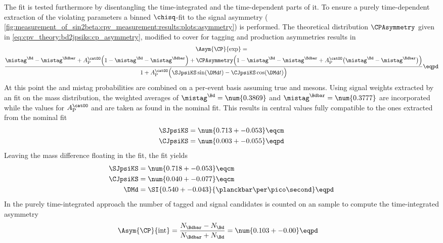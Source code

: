 The fit is tested furthermore by disentangling the time-integrated and the
time-dependent parts of it. To ensure a purely time-dependent extraction of the
\CP violating parameters a binned $\chisq$-fit to the signal \CP asymmetry (\cf
\cref{fig:measurement_of_sin2beta:cpv_measurement:results:plots:asymmetry}) is
performed. The theoretical distribution $\CPAsymmetry$ given in
\cref{eq:cpv_theory:bd2jpsiks:cp_asymmetry}, modified to cover for tagging
and production asymmetries results in
%
\begin{multline}
  \Asym{\CP}{\text{exp}} = \\
    \frac{\mistag^{\Bd} - \mistag^{\Bdbar} + A_{\text{P}}^{\catOO} \Bigl(1 - \mistag^{\Bd} - \mistag^{\Bdbar}\Bigr) + \CPAsymmetry \Bigl(1 - \mistag^{\Bd} - \mistag^{\Bdbar} + A_{\text{P}}^{\catOO} \bigl(\mistag^{\Bd} - \mistag^{\Bdbar}\bigr) \Bigr)}
    {1 + A_{\text{P}}^{\catOO} \Bigl(\SJpsiKS \sin (\DMd t) - \CJpsiKS \cos (\DMd t)\Bigr) } \eqpd
\end{multline}
%
At this point the \OS and \SSpi mistag probabilities are combined on a per-event
basis assuming true \Bd and \Bdbar mesons. Using signal weights extracted by an
\sPlot fit on the mass distribution, the weighted averages of $\mistag^{\Bd} =
\num{0.3869}$ and $\mistag^{\Bdbar} = \num{0.3777}$ are incorporated while the
values for $A_{\text{P}}^{\catOO}$ and \DMd are taken as found in the nominal
fit. This results in central values fully compatible to the ones extracted from
the nominal fit
%
\begin{equation*}
  \begin{split}
    \SJpsiKS &= \num{0.713 +- 0.053} \eqcm \\
    \CJpsiKS &= \num{0.003 +- 0.055} \eqpd
  \end{split}
\end{equation*}
%
Leaving the mass difference \DMd floating in the fit, the fit yields
%
\begin{equation*}
  \begin{split}
    \SJpsiKS &= \num{0.718 +- 0.053} \eqcm \\
    \CJpsiKS &= \num{0.040 +- 0.077} \eqcm \\
    \DMd     &= \SI{0.540 +- 0.043}{\planckbar\per\pico\second} \eqpd
  \end{split}
\end{equation*}
%
In the purely time-integrated approach the number of tagged \Bd and \Bdbar
signal candidates is counted on an \sweighted sample to compute the
time-integrated \CP asymmetry
%
\begin{equation}
  \begin{split}
    \Asym{\CP}{\text{int}} &= \frac{N_{\Bdbar} - N_{\Bd}}{N_{\Bdbar} + N_{\Bd}} = \num{0.103 +- 0.00} \eqpd
  \end{split}
\end{equation}
